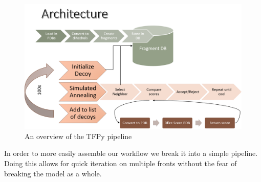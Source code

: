 \documentclass{article}
\begin{document}
\begin{figure}[H]
\begin{center}
\includegraphics[width=\textwidth]{pipeline}
\caption{An overview of the TFPy pipeline}
\label{Fig:blosum}
\end{center}
\end{figure}

In order to more easily assemble our workflow we break it into a simple pipeline. Doing this allows for quick iteration on multiple fronts without the fear of breaking the model as a whole.
\end{document}
